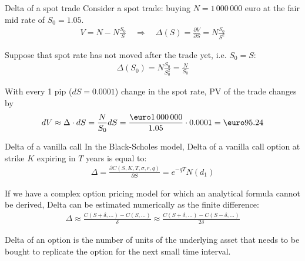 \documentclass{beamer}
\renewcommand{\EUR}[1]{\textup{\euro}#1}
\begin{document}
\begin{frame}{Delta of a spot trade}
\justify
Consider a spot trade: buying $N=1\,000\,000$ euro at the fair mid rate of $S_0=1.05$.
\begin{align*}
V = N - N\frac{S_0}{S} \quad \Rightarrow \quad \Delta(S) = \frac{\partial V}{\partial S} = N\frac{S_0}{S^2}
\end{align*}

\justify
Suppose that spot rate has not moved after the trade yet, i.e. $S_0=S$:
\begin{align*}
\Delta(S_0) = N\frac{S_0}{S_0^2} = \frac{N}{S_0}
\end{align*}

\justify
With every 1 pip ($dS=0.0001$) change in the spot rate, PV of the trade changes by 
\begin{align*}
dV \approx \Delta \cdot dS = \frac{N}{S_0}dS = \frac{\EUR{1\,000\,000}}{1.05}\cdot 0.0001 = \EUR{95.24}
\end{align*}
\end{frame}



\begin{frame}{Delta of a vanilla call}
\justify
In the Black-Scholes model, Delta of a vanilla call option at strike $K$ expiring in $T$ years is equal to:
\begin{align*}
\Delta = \frac{\partial C(S, K, T, \sigma, r, q)}{\partial S} = e^{-qT}N(d_1)
\end{align*}

\justify
If we have a complex option pricing model for which an analytical formula cannot be derived, Delta can be estimated numerically as the finite difference:
\begin{align*}
\Delta \approx \frac{C(S+\delta,...) - C(S,...)}{\delta} \approx \frac{C(S+\delta,...) - C(S-\delta,...)}{2\delta}
\end{align*}

\justify
Delta of an option is the number of units of the underlying asset that needs to be bought to replicate the option for the next small time interval.
\end{frame}
\end{document}
